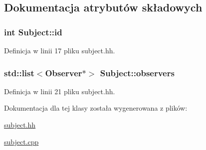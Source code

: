 \subsection{Dokumentacja atrybutów składowych}
\hypertarget{class_subject_a377b0647cc8da547c5cfc96aacad5b2f}{
\subsubsection[{id}]{\setlength{\rightskip}{0pt plus 5cm}int Subject\-::id\hspace{0.3cm}{\ttfamily [protected]}}}\label{class_subject_a377b0647cc8da547c5cfc96aacad5b2f}


Definicja w linii 17 pliku subject.\-hh.

\hypertarget{class_subject_a2c9d9122064e28385b1225e92cd6274d}{
\subsubsection[{observers}]{\setlength{\rightskip}{0pt plus 5cm}std\-::list$<${\bf Observer}$\ast$$>$ Subject\-::observers\hspace{0.3cm}{\ttfamily [protected]}}}\label{class_subject_a2c9d9122064e28385b1225e92cd6274d}


Definicja w linii 21 pliku subject.\-hh.



Dokumentacja dla tej klasy została wygenerowana z plików\-:\begin{DoxyCompactItemize}
\item 
\hyperlink{subject_8hh}{subject.\-hh}\item 
\hyperlink{subject_8cpp}{subject.\-cpp}\end{DoxyCompactItemize}

